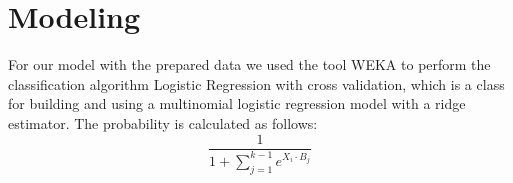 \chapter{Modeling}
For our model with the prepared data we used the tool WEKA to perform the classification algorithm Logistic Regression with cross validation, which is a class for building and using a multinomial logistic regression model with a ridge estimator. The probability is calculated as follows:
$$\frac{1}{1 + \sum_{j=1}^{k-1} e^{X_i \cdot B_j}}$$
